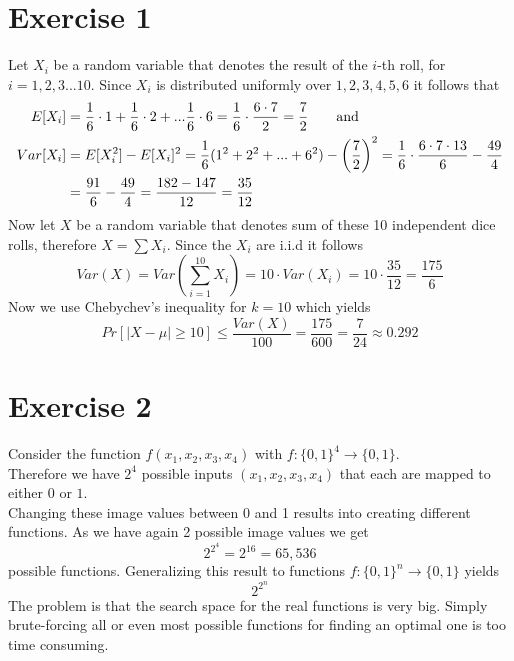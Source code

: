 \documentclass[12pt]{article}
\begin{document}
\section*{Exercise 1}

Let $X_i$ be a random variable that denotes the result of the $i$-th roll, for $i=1,2,3...10$. Since $X_i$ is distributed uniformly over $1,2,3,4,5,6$ it follows that 
\begin{align*}
	E[X_i] &= \frac{1}{6}\cdot 1 + \frac{1}{6}\cdot 2 + ... \frac{1}{6}\cdot 6 = \frac{1}{6}\cdot \frac{6 \cdot 7}{2} = \frac{7}{2} \text{\qquad and} \\
	Var[X_i] &= E[X_i^2] - E[X_i]^2 = \frac{1}{6}(1^2 + 2^2 + ... + 6^2) - \left( \frac{7}{2} \right)^2 = \frac{1}{6} \cdot \frac{6 \cdot 7 \cdot 13}{6} - \frac{49}{4} \\
	&= \frac{91}{6} - \frac{49}{4} = \frac{182 - 147}{12} = \frac{35}{12}
\end{align*}
Now let $X$ be a random variable that denotes sum of these 10 independent dice rolls, therefore $X = \sum X_i$. Since the $X_i$ are i.i.d it follows
\begin{equation*}                   
	Var(X) = Var(\sum_{i=1}^{10} X_i) = 10 \cdot Var(X_i) = 10 \cdot \frac{35}{12} = \frac{175}{6}
\end{equation*}                         
Now we use Chebychev's inequality for $k=10$ which yields
\begin{equation*}
	Pr[|X - \mu| \geq 10] \leq \frac{Var(X)}{100} = \frac{175}{600} = \frac{7}{24} \approx 0.292
\end{equation*}

\section*{Exercise 2}
Consider the function $f(x_1,x_2,x_3,x_4)$ with $f: \{0,1\}^4 \rightarrow \{0,1\}$. \\
Therefore we have $2^4$ possible inputs $(x_1,x_2,x_3,x_4)$ that each are mapped to either $0$ or $1$. \\
Changing these image values between 0 and 1 results into creating different functions. As we have again 2 possible image values we get
\begin{equation*}
	2^{2^4} = 2^{16} = 65,536
\end{equation*}
possible functions. Generalizing this result to functions  $f: \{0,1\}^n \rightarrow \{0,1\}$ yields
\begin{equation*}
	2^{2^n}
\end{equation*}                                                                                                                                                                    
The problem is that the search space for the real functions is very big. Simply brute-forcing all or even most possible functions for finding an optimal one is too time consuming.
\end{document}

